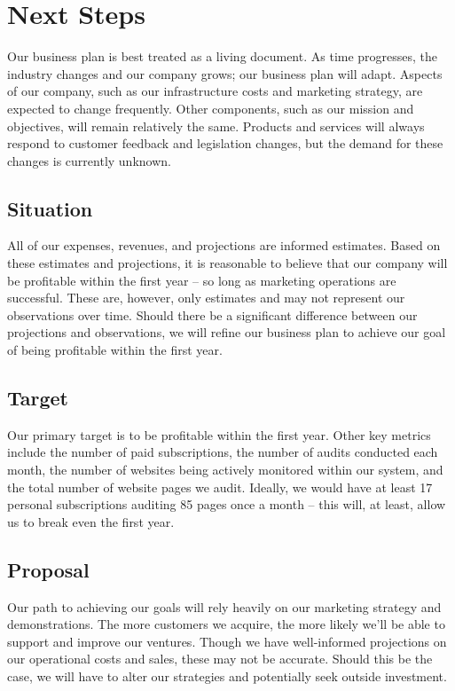{\let\cleardoublepage\relax \chapter*{Next Steps}}

Our business plan is best treated as a living document. As time progresses, the industry changes and our company grows; our business plan will adapt. Aspects of our company, such as our infrastructure costs and marketing strategy, are expected to change frequently. Other components, such as our mission and objectives, will remain relatively the same. Products and services will always respond to customer feedback and legislation changes, but the demand for these changes is currently unknown.

\section{Situation}

All of our expenses, revenues, and projections are informed estimates. Based on these estimates and projections, it is reasonable to believe that our company will be profitable within the first year -- so long as marketing operations are successful. These are, however, only estimates and may not represent our observations over time. Should there be a significant difference between our projections and observations, we will refine our business plan to achieve our goal of being profitable within the first year. 

\section{Target}

Our primary target is to be profitable within the first year. Other key metrics include the number of paid subscriptions, the number of audits conducted each month, the number of websites being actively monitored within our system, and the total number of website pages we audit. Ideally, we would have at least 17 personal subscriptions auditing 85 pages once a month -- this will, at least, allow us to break even the first year.

\section{Proposal}

Our path to achieving our goals will rely heavily on our marketing strategy and demonstrations. The more customers we acquire, the more likely we'll be able to support and improve our ventures. Though we have well-informed projections on our operational costs and sales, these may not be accurate. Should this be the case, we will have to alter our strategies and potentially seek outside investment.  